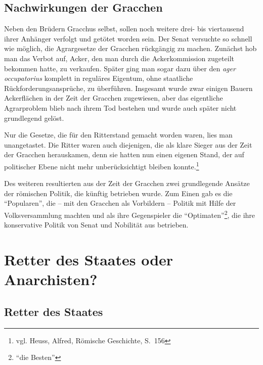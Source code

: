 \documentclass[
    12pt,
    smallheadings,
    ]{scrreprt}
\begin{document}
    \section{Nachwirkungen der Gracchen}
Neben den Brüdern Gracchus selbst, sollen noch weitere drei- bis viertausend ihrer Anhänger verfolgt und getötet worden sein.
Der Senat versuchte so schnell wie möglich, die Agrargesetze der Gracchen rückgängig zu machen.
Zunächst hob man das Verbot auf, Acker, den man durch die Ackerkommission zugeteilt bekommen hatte, zu verkaufen.
Später ging man sogar dazu über den \textit{ager occupatorius} komplett in reguläres Eigentum, ohne staatliche Rückforderungsansprüche, zu überführen. 
Insgesamt wurde zwar einigen Bauern Ackerflächen in der Zeit der Gracchen zugewiesen, aber das eigentliche Agrarproblem blieb nach ihrem Tod bestehen und wurde auch später nicht grundlegend gelöst.

Nur die Gesetze, die für den Ritterstand gemacht worden waren, lies man unangetastet.
Die Ritter waren auch diejenigen, die als klare Sieger aus der Zeit der Gracchen herauskamen, denn sie hatten nun einen eigenen Stand, der auf politischer Ebene nicht mehr unberücksichtigt bleiben konnte.\footnote{vgl. Heuss, Alfred, Römische Geschichte, S.~156}

Des weiteren resultierten aus der Zeit der Gracchen zwei grundlegende Ansätze der römischen Politik, die künftig betrieben wurde.
Zum Einen gab es die "`Popularen"', die -- mit den Gracchen als Vorbildern -- Politik mit Hilfe der Volksversammlung machten und als ihre Gegenspieler die "`Optimaten"'\footnote{"`die Besten"'}, die ihre konservative Politik von Senat und Nobilität aus betrieben.



\chapter{Retter des Staates oder Anarchisten?}
    \section{Retter des Staates}

\end{document}
